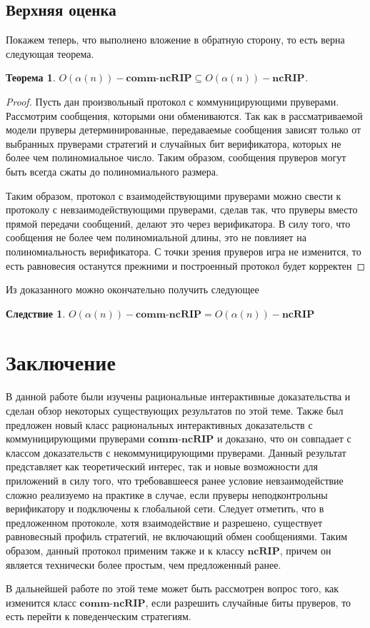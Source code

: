 \documentclass[14pt, a4paper]{extreport}
\newtheorem{theorem}{\indent Теорема}
\newtheorem{corollary}{\indent Следствие}
\begin{document}
            \section{Верхняя оценка}
            Покажем теперь, что выполнено вложение в обратную сторону, то есть верна следующая теорема.
            \begin{theorem}
                $O\left(\alpha(n)\right)-\textbf{comm-ncRIP} \subseteq O\left(\alpha(n)\right)-\textbf{ncRIP}$.
            \end{theorem}
            \begin{proof}
                Пусть дан произвольный протокол с коммуницирующими пруверами. Рассмотрим сообщения, которыми они обмениваются. Так как в рассматриваемой модели пруверы детерминированные, передаваемые сообщения зависят только от выбранных пруверами стратегий и случайных бит верификатора, которых не более чем полиномиальное число. Таким образом, сообщения пруверов могут быть всегда сжаты до полиномиального размера.

                Таким образом, протокол с взаимодействующими пруверами можно свести к протоколу с невзаимодействующими пруверами, сделав так, что пруверы вместо прямой передачи сообщений, делают это через верификатора. В силу того, что сообщения не более чем полиномиальной длины, это не повлияет на полиномиальность верификатора. С точки зрения пруверов игра не изменится, то есть равновесия останутся прежними и построенный протокол будет корректен
            \end{proof}
            Из доказанного можно окончательно получить следующее
            \begin{corollary}
                $O\left(\alpha(n)\right)-\textbf{comm-ncRIP} = O\left(\alpha(n)\right)-\textbf{ncRIP}$
            \end{corollary}
            \chapter*{Заключение}
            В данной работе были изучены рациональные интерактивные доказательства и сделан обзор некоторых существующих результатов по этой теме. Также был предложен новый класс рациональных интерактивных доказательств с коммуницирующими пруверами $\textbf{comm-ncRIP}$ и доказано, что он совпадает с классом доказательств с некоммуницирующими пруверами. Данный результат представляет как теоретический интерес, так и новые возможности для приложений в силу того, что требовавшееся ранее условие невзаимодействие сложно реализуемо на практике в случае, если пруверы неподконтрольны верификатору и подключены к глобальной сети. Следует отметить, что в предложенном протоколе, хотя взаимодействие и разрешено, существует равновесный профиль стратегий, не включающий обмен сообщениями. Таким образом, данный протокол применим также и к классу $\textbf{ncRIP}$, причем он является технически более простым, чем предложенный ранее.

            В дальнейшей работе по этой теме может быть рассмотрен вопрос того, как изменится класс $\textbf{comm-ncRIP}$, если разрешить случайные биты пруверов, то есть перейти к поведенческим стратегиям.
\newpage
\printbibliography
\end{document}
